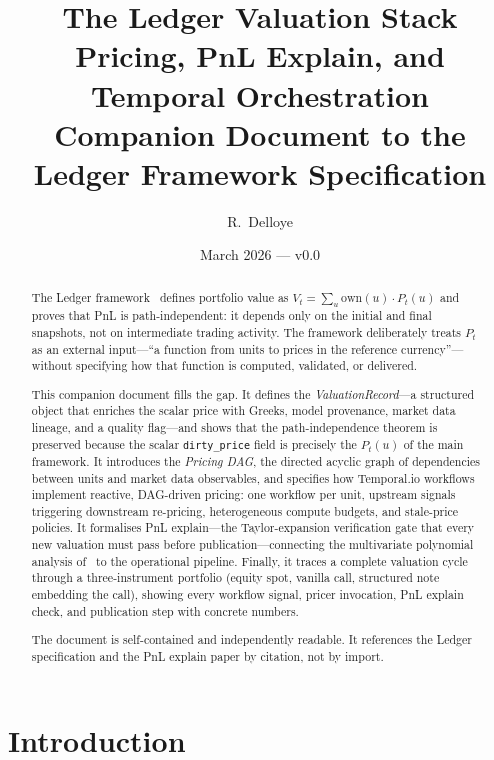 \documentclass[11pt,a4paper]{article}
\title{The Ledger Valuation Stack\\[6pt]
\large Pricing, PnL Explain, and Temporal Orchestration\\[4pt]
\normalsize Companion Document to the Ledger Framework Specification}
\author{R.\ Delloye}
\date{March 2026 --- v0.0}
\begin{document}
\maketitle

\begin{abstract}
The Ledger framework~\cite{ledger} defines portfolio value as $V_t = \sum_u \mathrm{own}(u) \cdot P_t(u)$ and proves that PnL is path-independent: it depends only on the initial and final snapshots, not on intermediate trading activity.  The framework deliberately treats $P_t$ as an external input---``a function from units to prices in the reference currency''---without specifying how that function is computed, validated, or delivered.

This companion document fills the gap.  It defines the \emph{ValuationRecord}---a structured object that enriches the scalar price with Greeks, model provenance, market data lineage, and a quality flag---and shows that the path-independence theorem is preserved because the scalar \texttt{dirty\_price} field is precisely the $P_t(u)$ of the main framework.  It introduces the \emph{Pricing DAG}, the directed acyclic graph of dependencies between units and market data observables, and specifies how Temporal.io workflows implement reactive, DAG-driven pricing: one workflow per unit, upstream signals triggering downstream re-pricing, heterogeneous compute budgets, and stale-price policies.  It formalises PnL explain---the Taylor-expansion verification gate that every new valuation must pass before publication---connecting the multivariate polynomial analysis of~\cite{pnl_explain} to the operational pipeline.  Finally, it traces a complete valuation cycle through a three-instrument portfolio (equity spot, vanilla call, structured note embedding the call), showing every workflow signal, pricer invocation, PnL explain check, and publication step with concrete numbers.

The document is self-contained and independently readable.  It references the Ledger specification and the PnL explain paper by citation, not by import.
\end{abstract}

\tableofcontents
\clearpage

\section{Introduction}
\label{sec:intro}
\end{document}
